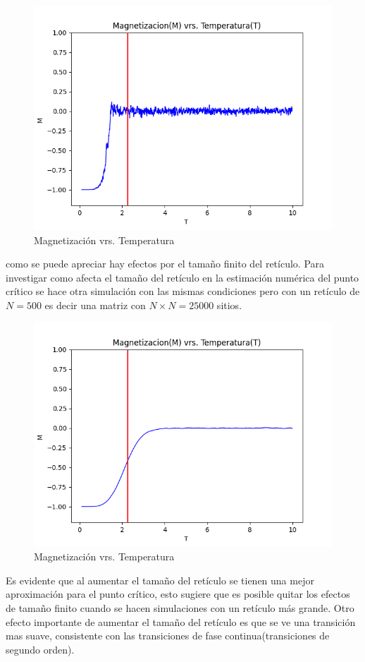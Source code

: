 \documentclass[a4paper]{article}
\begin{document}
\begin{figure}[H]
\begin{center}
\includegraphics[scale=0.6]{PlotMvT_sim1_v02.png} 
\end{center} 
\caption{Magnetización vrs. Temperatura}
\end{figure}
como se puede apreciar hay efectos por el tamaño finito del retículo. Para investigar como afecta el tamaño del retículo en la estimación numérica del punto crítico se hace otra simulación con las mismas condiciones pero con un retículo de $N=500$ es decir una matriz con $N\times N=25000$ sitios.
\begin{figure}[H]
\begin{center}
\includegraphics[scale=0.6]{PlotMvT_sim1_v03.png} 
\end{center} 
\caption{Magnetización vrs. Temperatura}
\end{figure}
Es evidente que al aumentar el tamaño del retículo se tienen una mejor aproximación para el punto crítico, esto sugiere que es posible quitar los efectos de tamaño finito cuando se hacen simulaciones con un retículo más grande. Otro efecto importante de aumentar el tamaño del retículo es que se ve una transición mas suave, consistente con las transiciones de fase continua(transiciones de segundo orden).
\end{document}
